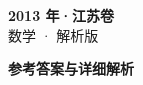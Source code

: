 \documentclass[zihao=-4, a4paper]{ctexart}
\begin{document}
\begin{center}
  {\Large\bfseries 2013 年·江苏卷}\\[4pt]
  {\large 数学 · 解析版}
\end{center}
\medskip
{}

\clearpage
{}
\begin{center}{\Large\bfseries 参考答案与详细解析}\end{center}
\medskip

\end{document}
